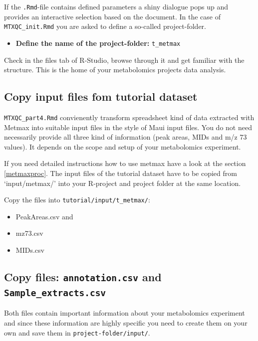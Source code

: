 \documentclass[]{book}
\providecommand{\tightlist}{%
  \setlength{\itemsep}{0pt}\setlength{\parskip}{0pt}}
\theoremstyle{definition}
\theoremstyle{definition}
\theoremstyle{definition}
\theoremstyle{remark}
\begin{document}
If the \texttt{.Rmd}-file contains defined parameters a shiny dialogue
pops up and provides an interactive selection based on the document. In
the case of \texttt{MTXQC\_init.Rmd} you are asked to define a so-called
project-folder.

\begin{itemize}
\tightlist
\item
  \textbf{Define the name of the project-folder:} \texttt{t\_metmax}
\end{itemize}

Check in the files tab of R-Studio, browse through it and get familiar
with the structure. This is the home of your metabolomics projects data
analysis.

\subsection{Copy input files fom tutorial
dataset}\label{copy-input-files-fom-tutorial-dataset}

\texttt{MTXQC\_part4.Rmd} convienently transform spreadsheet kind of
data extracted with Metmax into suitable input files in the style of
Maui input files. You do not need necessarily provide all three kind of
information (peak areas, MIDs and m/z 73 values). It depends on the
scope and setup of your metabolomics experiment.

If you need detailed instructions how to use metmax have a look at the
section \ref{metmaxproc}. The input files of the tutorial dataset have
to be copied from `input/metmax/' into your R-project and project folder
at the same location.

Copy the files into \texttt{tutorial/input/t\_metmax/}:

\begin{itemize}
\tightlist
\item
  PeakAreas.csv and
\item
  mz73.csv
\item
  MIDs.csv
\end{itemize}

\subsection{\texorpdfstring{Copy files: \texttt{annotation.csv} and
\texttt{Sample\_extracts.csv}}{Copy files: annotation.csv and Sample\_extracts.csv}}\label{copy-files-annotation.csv-and-sample_extracts.csv-1}

Both files contain important information about your metabolomics
experiment and since these information are highly specific you need to
create them on your own and save them in \texttt{project-folder/input/}.
\end{document}
